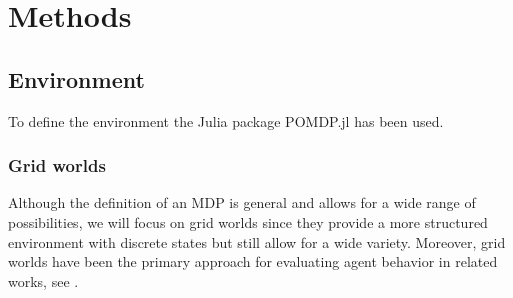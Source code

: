 \documentclass[12pt,A4]{report}
\theoremstyle{definition}
\begin{document}







\chapter{Methods}


\section{Environment}
To define the environment the Julia package POMDP.jl has been used. 

\subsection{Grid worlds}
Although the definition of an MDP is general and allows for a wide range of possibilities, we will focus on grid worlds since they provide a more structured environment with discrete states but still allow for a wide variety. Moreover, grid worlds have been the primary approach for evaluating agent behavior in related works, see \citet{Turner20}.
\end{document}
